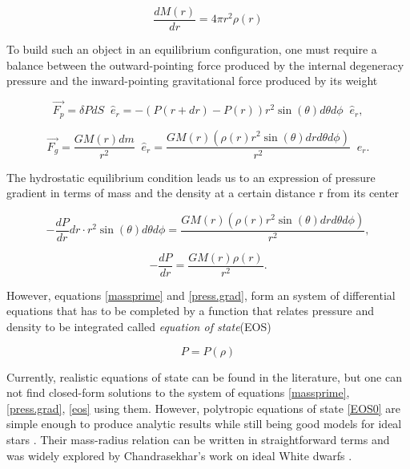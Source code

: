 \begin{equation}\label{massprime}
\frac{dM(r)}{dr} = 4\pi r^2 \rho(r) 
\end{equation}

To build such an object in an equilibrium configuration, one must require a balance between the outward-pointing force produced by the internal degeneracy pressure and the inward-pointing gravitational force produced by its weight 

\begin{equation}\label{grav.f}
\vec{F_p} = \delta P dS\;\; \hat{e}_r = - \left(P(r+dr) - P(r) \right)  r^2 \sin (\theta) d\theta d\phi \;\; \hat{e}_r, 
\end{equation}

\begin{equation}\label{press.f}
\vec{F_g} = \frac{G M(r) dm}{r^2} \;\; \hat{e}_r = \frac{G M(r) (\rho(r) r^2 \sin(\theta) dr d\theta d\phi)}{r^2} \;\; \hat{e}_r.
\end{equation}

The hydrostatic equilibrium condition leads us to an expression of pressure gradient in terms of mass and the density at a certain distance r from its center

\begin{equation}
-\frac{dP}{dr} dr \cdot r^2 \sin(\theta) d\theta d\phi = \frac{G M(r) (\rho(r) r^2 \sin(\theta) dr d\theta d\phi)}{r^2},
\end{equation}


\begin{equation}\label{press.grad}
-\frac{dP}{dr} = \frac{G M(r) \rho(r)}{r^2}. 
\end{equation}

However, equations \ref{massprime} and \ref{press.grad}, form an system of differential equations that has to be completed by a function that relates pressure and density to be integrated called \textit{equation of state}(EOS)

\begin{equation}\label{eos}
P = P(\rho)
\end{equation}

Currently, realistic equations of state \cite{Banik_2014,Steiner:2012rk,PhysRevD.79.124032} can be found in the literature, but one can not find closed-form solutions to the system of equations \ref{massprime}, \ref{press.grad}, \ref{eos} using them. However, polytropic equations of state \ref{EOS0} are simple enough to produce analytic results while still being good models for ideal stars \cite{Chandrasekhar:1931ih}. Their mass-radius relation can be written in straightforward terms and was widely explored by Chandrasekhar's work on ideal White dwarfs \cite{Shapiro:1983du,Chandrasekhar:1931ih, camenzind}. 

